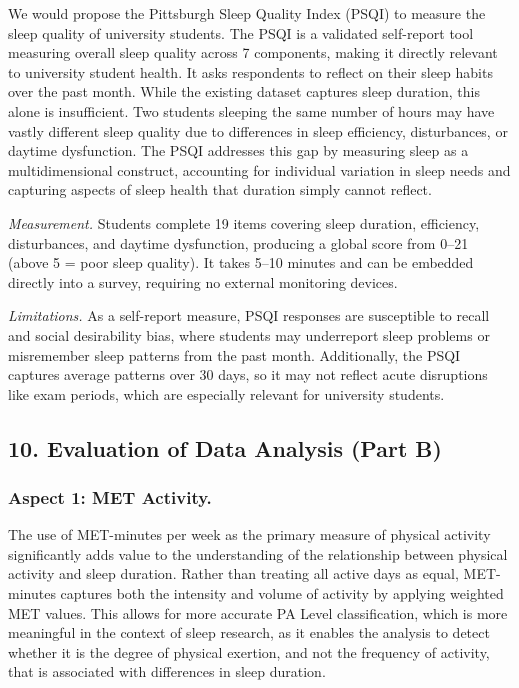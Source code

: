 We would propose the Pittsburgh Sleep Quality Index (PSQI) \cite{buysse1989} to measure the sleep quality of university students. The PSQI is a validated self-report tool measuring overall sleep quality across 7 components, making it directly relevant to university student health. It asks respondents to reflect on their sleep habits over the past month. While the existing dataset captures sleep duration, this alone is insufficient. Two students sleeping the same number of hours may have vastly different sleep quality due to differences in sleep efficiency, disturbances, or daytime dysfunction. The PSQI addresses this gap by measuring sleep as a multidimensional construct, accounting for individual variation in sleep needs and capturing aspects of sleep health that duration simply cannot reflect.

\textit{Measurement.} Students complete 19 items covering sleep duration, efficiency, disturbances, and daytime dysfunction, producing a global score from 0--21 (above 5 = poor sleep quality). It takes 5--10 minutes and can be embedded directly into a survey, requiring no external monitoring devices.

\textit{Limitations.} As a self-report measure, PSQI responses are susceptible to recall and social desirability bias, where students may underreport sleep problems or misremember sleep patterns from the past month. Additionally, the PSQI captures average patterns over 30 days, so it may not reflect acute disruptions like exam periods, which are especially relevant for university students.

\subsection*{10. Evaluation of Data Analysis (Part B)}

\subsubsection*{Aspect 1: MET Activity.}
The use of MET-minutes per week as the primary measure of physical activity significantly adds value to the understanding of the relationship between physical activity and sleep duration. Rather than treating all active days as equal, MET-minutes captures both the intensity and volume of activity by applying weighted MET values. This allows for more accurate PA Level classification, which is more meaningful in the context of sleep research, as it enables the analysis to detect whether it is the degree of physical exertion, and not the frequency of activity, that is associated with differences in sleep duration.

